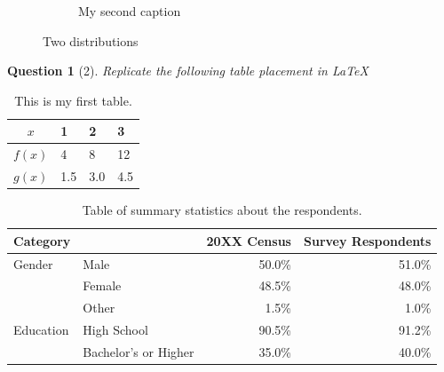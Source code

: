\documentclass[11pt]{article}
\theoremstyle{quest}
\newtheorem*{question}{Question}
\begin{document}
\begin{figure}[h]
\begin{subfigure}{0.45\textwidth}
         \caption{My second caption}
     \end{subfigure}
        \caption{Two distributions}
\end{figure}

\clearpage
\begin{question}[2]
  Replicate the following table placement in LaTeX 
\end{question}

\begin{table}[h!]
    \centering
    \begin{tabular}{|c||l|l|l|}
    \hline
    $x$ & 1 & 2 & 3\\
    \hline
    $f(x)$ & 4 & 8 & 12\\
    $g(x)$ & 1.5 & 3.0 & 4.5\\
    \hline
    \end{tabular}
    \caption{This is my first table.}
\end{table}

\begin{table}[h!] %
\centering
\begin{tabular}{ll|rr}
\hline
\hline
Category &  & 20XX Census & Survey Respondents \\ 
\hline
Gender & Male & 50.0\% & 51.0\% \\ 
   & Female & 48.5\% & 48.0\% \\ 
   & Other & 1.5\% & 1.0\% \\ 
\hline
Education & High School & 90.5\% & 91.2\%  \\ 
   & Bachelor's or Higher & 35.0\% & 40.0\% \\ 
\hline
\hline
\end{tabular}
\caption{Table of summary statistics about the respondents.}
\end{table}

\end{document}
